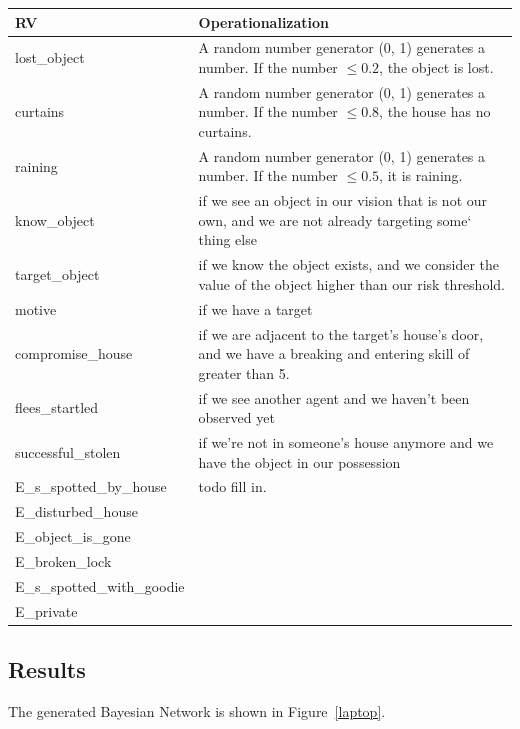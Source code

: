 \begin{adjustbox}{center}
\footnotesize
\begin{tabular}{|l|l|}
 \hline
 RV &Operationalization\\
 \hline
lost\_object   & A random number generator (0, 1) generates a number. If the number $\leq 0.2$, the object is lost.\\
curtains & A random number generator (0, 1) generates a number. If the number $\leq 0.8$, the house has no curtains.  \\
raining & A random number generator (0, 1) generates a number. If the number $\leq 0.5$, it is raining.   \\
know\_object & if we see an object in our vision that is not our own, and we are not already targeting some`
thing else  \\
target\_object & if we know the object exists, and we consider the value of the object higher than our risk threshold.  \\
motive & if we have a target \\
compromise\_house & if we are adjacent to the target's house's door, and we have a breaking and entering skill of greater than 5. \\
flees\_startled & if we see another agent and we haven't been observed yet  \\
successful\_stolen & if we're not in someone's house anymore and we have the object in our possession \\ 
E\_s\_spotted\_by\_house&  {\color{red} todo fill in}. \\ 
E\_disturbed\_house&   \\ 
E\_object\_is\_gone&   \\ 
E\_broken\_lock&   \\ 
E\_s\_spotted\_with\_goodie&   \\ 
E\_private&   \\ 
\hline
\end{tabular}
\end{adjustbox}


\subsection{Results}

The generated Bayesian Network is shown in Figure~\ref{laptop}.

